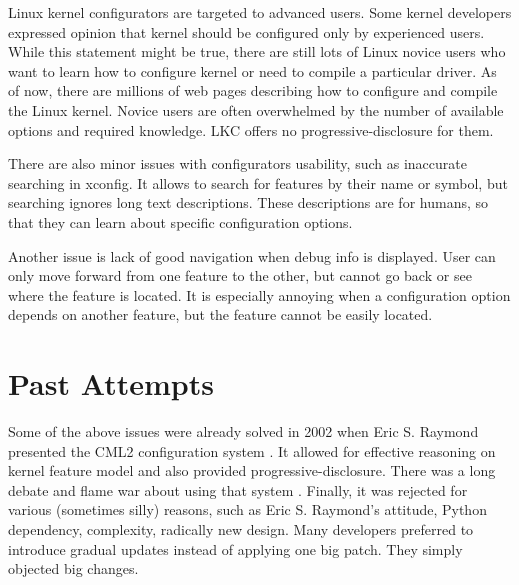 \documentclass{chi2009}
\begin{document}
Linux kernel configurators are targeted to advanced users. Some kernel developers expressed opinion \cite{ADDREF} that kernel should be configured only by experienced users. While this statement might be true, there are still lots of Linux novice users who want to learn how to configure kernel or need to compile a particular driver. As of now, there are millions of web pages describing how to configure and compile the Linux kernel. Novice users are often overwhelmed by the number of available options and required knowledge. LKC offers no progressive-disclosure for them.

There are also minor issues with configurators usability, such as inaccurate searching in xconfig. It allows to search for features by their name or symbol, but searching ignores long text descriptions. These descriptions are for humans, so that they can learn about specific configuration options.

Another issue is lack of good navigation when debug info is displayed. User can only move forward from one feature to the other, but cannot go back or see where the feature is located. It is especially annoying when a configuration option depends on another feature, but the feature cannot be easily located.

\section{Past Attempts}
Some of the above issues were already solved in 2002 when Eric S. Raymond presented the CML2 configuration system \cite{raymond:cml2:2000}. It allowed for effective reasoning on kernel feature model and also provided progressive-disclosure. There was a long debate and flame war about using that system \cite{kerneltrap:linux:2002}. Finally, it was rejected for various (sometimes silly) reasons, such as Eric S. Raymond's attitude, Python dependency, complexity, radically new design. Many developers preferred to introduce gradual updates instead of applying one big patch. They simply objected big changes.
\end{document}
